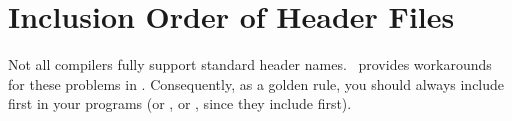 










\section{Inclusion Order of Header Files}
Not all compilers fully support standard header names. \cgal\ provides 
workarounds for these problems in . Consequently, as a 
golden rule, you should always include  first in your 
programs (or , or , since they 
include  first).






